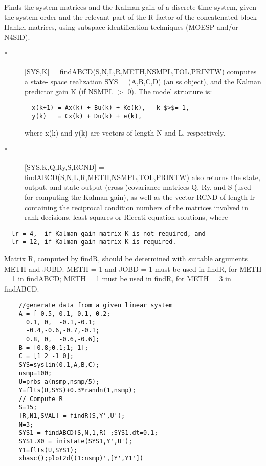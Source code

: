 \begin{mandescription}
  Finds the system matrices and the Kalman gain of a discrete-time 
  system, given the system order and the relevant part of the 
  R factor of the concatenated block-Hankel matrices, using subspace 
  identification techniques (MOESP and/or N4SID).
  \begin{description}
  \item[*] [SYS,K] = findABCD(S,N,L,R,METH,NSMPL,TOL,PRINTW)  computes a state- space realization SYS = (A,B,C,D) (an ss object), and the Kalman predictor gain K (if NSMPL $>$ 0). The model structure is:
\begin{verbatim}
  x(k+1) = Ax(k) + Bu(k) + Ke(k),   k $>$= 1,
  y(k)   = Cx(k) + Du(k) + e(k),
\end{verbatim}
where x(k) and y(k) are vectors of length N and L, respectively.
\item[*] [SYS,K,Q,Ry,S,RCND] = findABCD(S,N,L,R,METH,NSMPL,TOL,PRINTW)  also returns the state, output, and state-output (cross-)covariance matrices Q, Ry, and S (used for computing the Kalman gain), as well as the vector RCND of length lr containing the reciprocal condition numbers of the matrices involved in rank decisions, least squares or Riccati equation solutions, where 
  \end{description}
\begin{verbatim}
  lr = 4,  if Kalman gain matrix K is not required, and
  lr = 12, if Kalman gain matrix K is required.
\end{verbatim}
Matrix R, computed by findR, should be determined with suitable arguments
METH and JOBD.  METH = 1 and JOBD = 1 must be used in findR, for METH = 1 
in findABCD;  METH = 1 must be used in findR, for METH = 3 in findABCD.
\end{mandescription}
\begin{examples}
  \begin{Verbatim}
    //generate data from a given linear system
    A = [ 0.5, 0.1,-0.1, 0.2;
      0.1, 0,  -0.1,-0.1;      
      -0.4,-0.6,-0.7,-0.1;  
      0.8, 0,  -0.6,-0.6];      
    B = [0.8;0.1;1;-1];
    C = [1 2 -1 0];
    SYS=syslin(0.1,A,B,C);
    nsmp=100;
    U=prbs_a(nsmp,nsmp/5);
    Y=flts(U,SYS)+0.3*randn(1,nsmp);
    // Compute R
    S=15;
    [R,N1,SVAL] = findR(S,Y',U');
    N=3;
    SYS1 = findABCD(S,N,1,R) ;SYS1.dt=0.1;
    SYS1.X0 = inistate(SYS1,Y',U');
    Y1=flts(U,SYS1);
    xbasc();plot2d((1:nsmp)',[Y',Y1'])
  \end{Verbatim}
\end{examples}
\begin{manseealso}
         
\end{manseealso}

